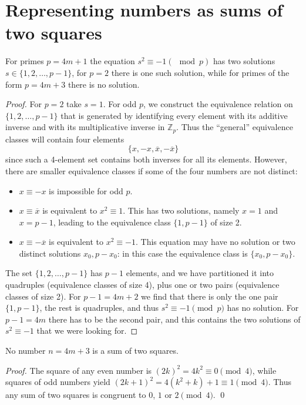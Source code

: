 \chapter{Representing numbers as sums of two squares}

\begin{lemma}[Lemma 1]
  \label{ch4.lemma1}
  For primes \(p = 4m + 1\) the equation \(s^2 \equiv -1 (\mod p)\) has two
  solutions \(s \in \{1, 2, \dots, p - 1\}\), for \(p = 2\) there is one such solution, while
  for primes of the form \(p = 4m + 3\) there is no solution.
\end{lemma}
\begin{proof}
   For $p = 2$ take $s = 1$.
   For odd $p$, we construct the equivalence relation on
   $\{1, 2, \dots, p - 1\}$ that is generated by identifying every
   element with its additive inverse and with its multiplicative inverse
   in $\mathbb{Z}_p$. Thus the ``general'' equivalence classes will contain four elements
  \[
  \{x, -x, \overline{x}, -\overline{x}\}
  \]
since such a 4-element set contains both inverses for all its elements. However,
there are smaller equivalence classes if some of the four numbers are not distinct:

\begin{itemize}
  \item $x \equiv -x$ is impossible for odd $p$.
  \item $x \equiv \overline{x}$ is equivalent to $x^2 \equiv 1$. This has two solutions,
    namely $x = 1$ and $x = p - 1$, leading to the equivalence class $\{1, p - 1\}$ of size 2.
  \item $x \equiv -\overline{x}$ is equivalent to $x^2 \equiv -1$. This equation may
    have no solution or two distinct solutions $x_0, p - x_0$: in this case the equivalence
    class is $\{x_0, p - x_0\}$.
\end{itemize}

The set $\{1, 2, \dots, p - 1\}$ has $p - 1$ elements, and we have partitioned it
into quadruples (equivalence classes of size 4), plus one or two pairs (equivalence
classes of size 2). For $p - 1 = 4m + 2$ we find that there is only the one pair $\{1, p - 1\}$,
the rest is quadruples, and thus $s^2 \equiv -1 \pmod{p}$ has no solution.
For $p - 1 = 4m$ there has to be the second pair,
and this contains the two solutions of $s^2 \equiv -1$ that we were looking for.
\end{proof}


\begin{lemma}[Lemma 2]
  \label{ch4.lemma2}
  No number \(n = 4m + 3\) is a sum of two squares.
\end{lemma}
\begin{proof}
  \leanok
  The square of any even number is $(2k)^2 = 4k^2 \equiv 0 \pmod{4}$,
  while squares of odd numbers yield $(2k + 1)^2 = 4(k^2 + k) + 1 \equiv 1 \pmod{4}$.
  Thus any sum of two squares is congruent to $0$, $1$ or $2 \pmod{4}$. \qed
\end{proof}


